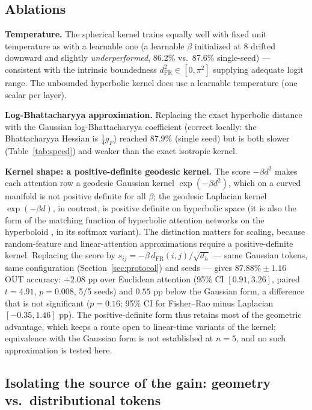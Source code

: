 \documentclass[11pt]{article}
\newcommand{\dFR}{d_{\mathrm{FR}}}
\begin{document}
\subsection{Ablations}\label{sec:ablations}

\textbf{Temperature.} The spherical kernel trains equally well with fixed unit temperature as with a learnable one (a learnable $\beta$ initialized at 8 drifted downward and slightly \emph{underperformed}, 86.2\% vs.\ 87.6\% single-seed) --- consistent with the intrinsic boundedness $d^2_{\mathrm{FR}} \in [0, \pi^2]$ supplying adequate logit range. The unbounded hyperbolic kernel does use a learnable temperature (one scalar per layer).

\textbf{Log-Bhattacharyya approximation.} Replacing the exact hyperbolic distance with the Gaussian log-Bhattacharyya coefficient (correct locally: the Bhattacharyya Hessian is $\tfrac14 g_F$) reached 87.9\% (single seed) but is both slower (Table~\ref{tab:speed}) and weaker than the exact isotropic kernel.

\textbf{Kernel shape: a positive-definite geodesic kernel.} The score $-\beta d^2$ makes each attention row a geodesic Gaussian kernel $\exp(-\beta d^2)$, which on a curved manifold is not positive definite for all $\beta$; the geodesic Laplacian kernel $\exp(-\beta d)$, in contrast, is positive definite on hyperbolic space \cite{feragen2015} (it is also the form of the matching function of hyperbolic attention networks on the hyperboloid \cite{gulcehre2019}, in its softmax variant). The distinction matters for scaling, because random-feature and linear-attention approximations require a positive-definite kernel. Replacing the score by $s_{ij} = -\beta\, \dFR(i,j)/\sqrt{d_h}$ --- same Gaussian tokens, same configuration (Section~\ref{sec:protocol}) and seeds --- gives $87.88\% \pm 1.16$ OUT accuracy: $+2.08$ pp over Euclidean attention (95\% CI $[0.91, 3.26]$, paired $t = 4.91$, $p = 0.008$, 5/5 seeds) and $0.55$ pp below the Gaussian form, a difference that is not significant ($p = 0.16$; 95\% CI for Fisher--Rao minus Laplacian $[-0.35, 1.46]$ pp). The positive-definite form thus retains most of the geometric advantage, which keeps a route open to linear-time variants of the kernel; equivalence with the Gaussian form is not established at $n = 5$, and no such approximation is tested here.

\subsection{Isolating the source of the gain: geometry vs.\ distributional tokens}\label{sec:wasserstein}
\end{document}
